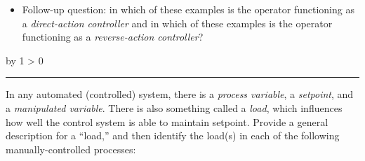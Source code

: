 \documentclass[12pt,a4paper]{article}
\def\oppgave{
            \advance\questnum by 1
            \ifnum \questnum > 0
                 \hrule
                 \vskip 3pt
                 \leftline{Oppgave \the\questnum}
                 \vskip 3pt \fi}
\begin{document}
\begin{itemize}
\item{} Follow-up question: in which of these examples is the operator functioning as a {\it direct-action controller} and in which of these examples is the operator functioning as a {\it reverse-action controller}?
\end{itemize}

\vskip 10pt \filbreak 
\oppgave{} 

In any automated (controlled) system, there is a {\it process variable}, a {\it setpoint}, and a {\it manipulated variable}.  There is also something called a {\it load}, which influences how well the control system is able to maintain setpoint.  Provide a general description for a ``load,'' and then identify the load(s) in each of the following manually-controlled processes:
\end{document}
